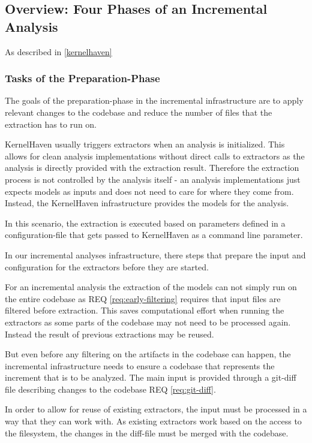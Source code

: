 \documentclass[a4paper]{article}
\begin{document}
\subsection{Overview: Four Phases of an Incremental Analysis}

As described in \autoref{kernelhaven}

\subsubsection{Tasks of the Preparation-Phase}

The goals of the preparation-phase in the incremental infrastructure are to apply relevant changes to the codebase and reduce the number of files that the extraction has to run on.

KernelHaven usually triggers extractors when an analysis is initialized. This allows for clean analysis implementations without direct calls to extractors as the analysis is directly provided with the extraction result. Therefore the extraction process is not controlled by the analysis itself - an analysis implementations just expects models as inputs and does not need to care for where they come from. Instead, the KernelHaven infrastructure provides the models for the analysis.

In this scenario, the extraction is executed based on parameters defined in a configuration-file that gets passed to KernelHaven as a command line parameter.

In our incremental analyses infrastructure, there steps that prepare the input and configuration for the extractors before they are started.

For an incremental analysis the extraction of the models can not simply run on the entire codebase as REQ \ref{req:early-filtering} requires that input files are filtered before extraction. This saves computational effort when running the extractors as some parts of the codebase  may not need to be processed again. Instead the result of previous extractions may be reused.

 But even before any filtering on the artifacts in the codebase can happen, the incremental infrastructure needs to ensure a codebase that represents the increment that is to be analyzed. The main input is provided through a git-diff file describing changes to the codebase REQ \ref{req:git-diff}. 
 
 In order to allow for reuse of existing extractors, the input must be processed in a way that they can work with. As existing extractors work based on the access to the filesystem, the changes in the diff-file must be merged with the codebase.
\end{document}
